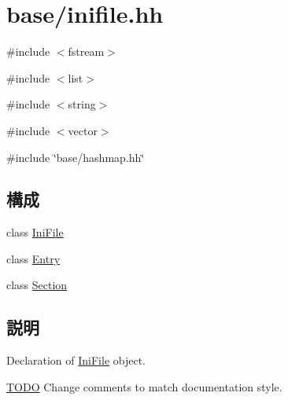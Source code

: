 \hypertarget{inifile_8hh}{
\section{base/inifile.hh}
\label{inifile_8hh}
}
{\ttfamily \#include $<$fstream$>$}\par
{\ttfamily \#include $<$list$>$}\par
{\ttfamily \#include $<$string$>$}\par
{\ttfamily \#include $<$vector$>$}\par
{\ttfamily \#include \char`\"{}base/hashmap.hh\char`\"{}}\par
\subsection*{構成}
\begin{DoxyCompactItemize}
\item 
class \hyperlink{classIniFile}{IniFile}
\item 
class \hyperlink{classIniFile_1_1Entry}{Entry}
\item 
class \hyperlink{classIniFile_1_1Section}{Section}
\end{DoxyCompactItemize}


\subsection{説明}
Declaration of \hyperlink{classIniFile}{IniFile} object. \begin{Desc}
\item[\hyperlink{todo__todo000006}{TODO}]Change comments to match documentation style. \end{Desc}
